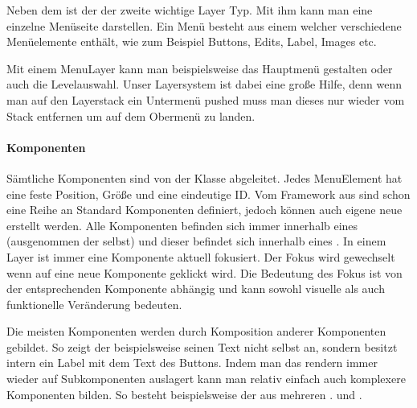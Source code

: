 Neben dem  ist der  der zweite wichtige Layer Typ. Mit ihm kann man eine einzelne Menüseite darstellen.
Ein Menü besteht aus einem  welcher verschiedene Menüelemente enthält, wie zum Beispiel Buttons, Edits, Label, Images etc.

Mit einem MenuLayer kann man beispielsweise das Hauptmenü gestalten oder auch die Levelauswahl. Unser Layersystem ist dabei eine große Hilfe, denn wenn man auf den Layerstack ein Untermenü pushed muss man dieses nur wieder vom Stack entfernen um auf dem Obermenü zu landen.

\paragraph{Komponenten}

Sämtliche Komponenten sind von der Klasse  abgeleitet. Jedes MenuElement hat eine feste Position, Größe und eine eindeutige ID. Vom Framework aus sind schon eine Reihe an Standard Komponenten definiert, jedoch können auch eigene neue erstellt werden.
Alle Komponenten befinden sich immer innerhalb eines  (ausgenommen der  selbst) und dieser befindet sich innerhalb eines . In einem Layer ist immer eine Komponente aktuell fokusiert. Der Fokus wird gewechselt wenn auf eine neue Komponente geklickt wird. Die Bedeutung des Fokus ist von der entsprechenden Komponente abhängig und kann sowohl visuelle als auch funktionelle Veränderung bedeuten.


Die meisten Komponenten werden durch Komposition anderer Komponenten gebildet. So zeigt der  beispielsweise seinen Text nicht selbst an, sondern besitzt intern ein Label mit dem Text des Buttons. Indem man das rendern immer wieder auf Subkomponenten auslagert kann man relativ einfach auch komplexere Komponenten bilden. So besteht beispielsweise der  aus mehreren .  und . 

